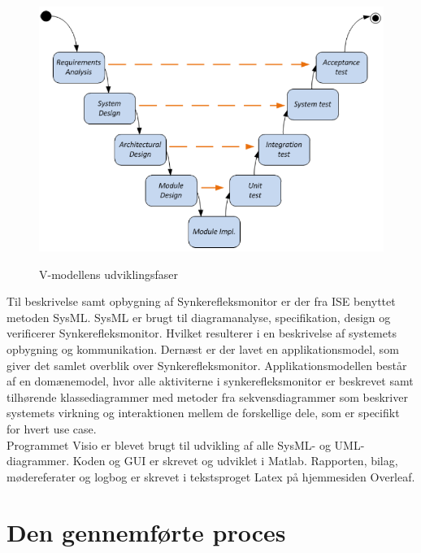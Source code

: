 \begin{figure}[H]
\centering
{\includegraphics[width=\textwidth]
{Figure/vmodel}}
\caption{V-modellens udviklingsfaser\cite{IngenirhjskolenAarhusUniversitetDevelopmentASE}}
\label{vmodel}
\end{figure}








Til beskrivelse samt opbygning af Synkerefleksmonitor er der fra ISE benyttet metoden SysML. SysML er brugt til diagramanalyse, specifikation, design og verificerer Synkerefleksmonitor. Hvilket resulterer i en beskrivelse af systemets opbygning og kommunikation. Dernæst er der lavet en applikationsmodel, som giver det samlet overblik over Synkerefleksmonitor. Applikationsmodellen består af en domænemodel, hvor alle aktiviterne i synkerefleksmonitor er beskrevet samt tilhørende klassediagrammer med metoder fra sekvensdiagrammer som beskriver systemets virkning og interaktionen mellem de forskellige dele, som er specifikt for hvert use case.\\

Programmet Visio er blevet brugt til udvikling af alle SysML- og UML-diagrammer. Koden og GUI er skrevet og udviklet i Matlab. Rapporten, bilag, mødereferater og logbog er skrevet i tekstsproget Latex på hjemmesiden Overleaf. 

\section{Den gennemførte proces}

